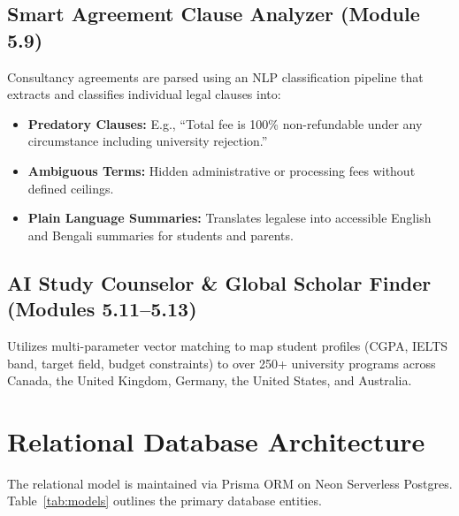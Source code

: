 \documentclass[11pt,a4paper]{article}
\begin{document}
\subsection{Smart Agreement Clause Analyzer (Module 5.9)}
Consultancy agreements are parsed using an NLP classification pipeline that extracts and classifies individual legal clauses into:
\begin{itemize}
    \item \textbf{Predatory Clauses:} E.g., ``Total fee is 100\% non-refundable under any circumstance including university rejection.''
    \item \textbf{Ambiguous Terms:} Hidden administrative or processing fees without defined ceilings.
    \item \textbf{Plain Language Summaries:} Translates legalese into accessible English and Bengali summaries for students and parents.
\end{itemize}

\subsection{AI Study Counselor \& Global Scholar Finder (Modules 5.11–5.13)}
Utilizes multi-parameter vector matching to map student profiles (CGPA, IELTS band, target field, budget constraints) to over 250+ university programs across Canada, the United Kingdom, Germany, the United States, and Australia.

\section{Relational Database Architecture}

The relational model is maintained via Prisma ORM on Neon Serverless Postgres. Table~\ref{tab:models} outlines the primary database entities.
\end{document}
